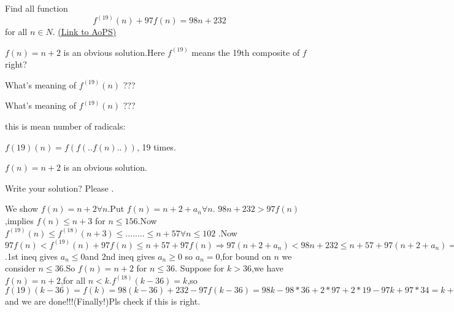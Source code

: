 \begin{problem}
	Find all  function  \[ f^{(19)}(n)+97f(n)=98n+232 \]
for all  $ n\in N .$
	\flushright \href{https://artofproblemsolving.com/community/c6h534882}{(Link to AoPS)}
\end{problem}



\begin{solution}
	$f(n)=n+2$ is an obvious solution.Here $f^{(19)}$ means the 19th composite of $f$ right?
\end{solution}



\begin{solution}
	What's meaning of $f^{(19)}(n)$ ???
\end{solution}



\begin{solution}
	\begin{tcolorbox}What's meaning of $f^{(19)}(n)$ ???\end{tcolorbox}  
this is mean number of radicals:
 
$f{(19)}(n)=f(f(..f(n)..))$,  19 times.   
\begin{tcolorbox}$f(n)=n+2$ is an obvious solution.\end{tcolorbox}
Write your solution?  Please .
\end{solution}



\begin{solution}
	We show $f(n)=n+2\forall{n}$.Put $f(n)=n+2+a_n\forall{n}$. $98n+232>97f(n)$,implies $f(n)\le n+3$ for $n\le156$.Now $f^{(19)}(n)\le f^{(18)}(n+3)\le........\le n+57 \forall{n}\le102$ .Now $97f(n)<f^{(19)}(n)+97f(n)\le n+57+97f(n) \Rightarrow 97(n+2+a_n)< 98n+232 \le n+57+97(n+2+a_n) \Rightarrow 97a_n<38,97a_n+251\ge 232$.1st ineq gives $a_n\le0$and 2nd ineq gives $a_n\ge0$ so $a_n=0$,for bound on $n$ we consider $n\le36$.So $f(n)=n+2$ for $n\le36$. Suppose for $k>36$,we have $f(n)=n+2$,for all $n<k$.$f^{(18)}(k-36)=k$,so $f{(19)}(k-36)=f(k)=98(k-36)+232-97f(k-36)=98k-98*36+2*97+2*19-97k+97*34=k+2$ and we are done!!!(Finally!)Pls check if this is right.
\end{solution}




